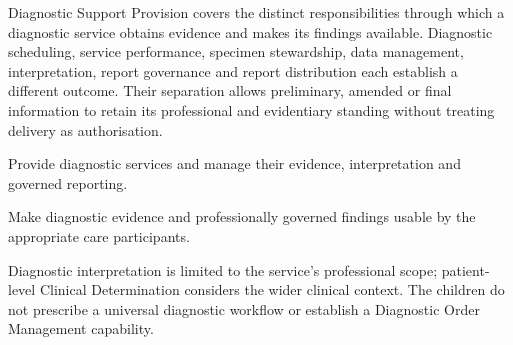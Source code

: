 Diagnostic Support Provision covers the distinct responsibilities through which a diagnostic service obtains evidence and makes its findings available. Diagnostic scheduling, service performance, specimen stewardship, data management, interpretation, report governance and report distribution each establish a different outcome. Their separation allows preliminary, amended or final information to retain its professional and evidentiary standing without treating delivery as authorisation.



Provide diagnostic services and manage their evidence, interpretation and governed reporting.



Make diagnostic evidence and professionally governed findings usable by the appropriate care participants.



Diagnostic interpretation is limited to the service's professional scope; patient-level Clinical Determination considers the wider clinical context. The children do not prescribe a universal diagnostic workflow or establish a Diagnostic Order Management capability.


